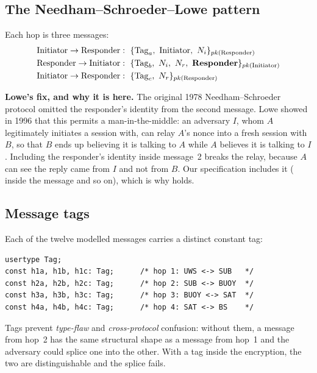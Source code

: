 \subsection{The Needham--Schroeder--Lowe pattern}

Each hop is three messages:
\begin{align}
\text{Initiator} \to \text{Responder}&: \ \{\mathrm{Tag}_a,\ \text{Initiator},\ N_i\}_{pk(\text{Responder})} \notag\\
\text{Responder} \to \text{Initiator}&: \ \{\mathrm{Tag}_b,\ N_i,\ N_r,\ \textbf{Responder}\}_{pk(\text{Initiator})} \notag\\
\text{Initiator} \to \text{Responder}&: \ \{\mathrm{Tag}_c,\ N_r\}_{pk(\text{Responder})} \notag
\end{align}

\begin{keybox}
\textbf{Lowe's fix, and why it is here.} The original 1978 Needham--Schroeder protocol
omitted the responder's identity from the second message. Lowe showed in 1996 \cite{lowe}
that this permits a man-in-the-middle: an adversary $I$, whom $A$ legitimately initiates a
session with, can relay $A$'s nonce into a fresh session with $B$, so that $B$ ends up
believing it is talking to $A$ while $A$ believes it is talking to $I$. Including the
responder's identity inside message~2 breaks the relay, because $A$ can see the reply came
from $I$ and not from $B$. Our specification includes it ( inside the 
message and so on), which is why  holds.
\end{keybox}

\subsection{Message tags}

Each of the twelve modelled messages carries a distinct constant tag:

\begin{lstlisting}[style=good,caption={Tag declarations (\code{uwc\_protocol.spdl},
lines 16--20).}]
usertype Tag;
const h1a, h1b, h1c: Tag;      /* hop 1: UWS <-> SUB   */
const h2a, h2b, h2c: Tag;      /* hop 2: SUB <-> BUOY  */
const h3a, h3b, h3c: Tag;      /* hop 3: BUOY <-> SAT  */
const h4a, h4b, h4c: Tag;      /* hop 4: SAT <-> BS    */
\end{lstlisting}

Tags prevent \emph{type-flaw} and \emph{cross-protocol} confusion: without them, a message
from hop~2 has the same structural shape as a message from hop~1 and the adversary could
splice one into the other. With a tag inside the encryption, the two are distinguishable and
the splice fails.


